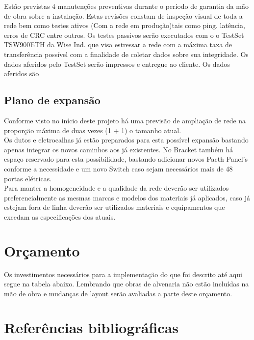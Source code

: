 \documentclass[	DIV=calc,%
							paper=a4,%
							fontsize=12pt,%
							onecolumn]{scrartcl}	 					%
\begin{document}
Estão previstas 4 manutenções preventivas durante o período de garantia da mão de obra sobre a instalação. Estas revisões constam de inspeção visual de toda a rede bem como testes ativos (Com a rede em produção)tais como ping. latência, erros de CRC entre outros. Os testes passivos serão executados com o o TestSet TSW900ETH da Wise Ind. que visa estressar a rede com a máxima taxa de transferência possível com a finalidade de coletar dados sobre sua integridade. Os dados aferidos pelo TestSet serão impressos e entregue ao cliente. Os dados aferidos são





\subsection{Plano de expansão}
Conforme visto no início deste projeto há uma previsão de ampliação de rede na proporção máxima de duas vezes (1 + 1) o tamanho atual.\\
Os dutos e eletrocalhas já estão preparados para esta possível expansão bastando apenas integrar os novos caminhos aos já existentes. No Bracket também há espaço reservado para esta possibilidade, bastando adicionar novos Pacth Panel's conforme a necessidade e um novo Switch caso sejam necessários mais de 48 portas elétricas.\\
Para manter a homogeneidade e a qualidade da rede deverão ser utilizados preferencialmente as mesmas marcas e modelos dos materiais já aplicados, caso já estejam fora de linha deverão ser utilizados materiais e equipamentos que excedam as especificações dos atuais. 

\section{Orçamento}
Os investimentos necessários para a implementação do que foi descrito até aqui segue na tabela abaixo. Lembrando que obras de alvenaria não estão incluídas na mão de obra e mudanças de layout serão avaliadas a parte deste orçamento.



\section{Referências bibliográficas}
\end{document}
